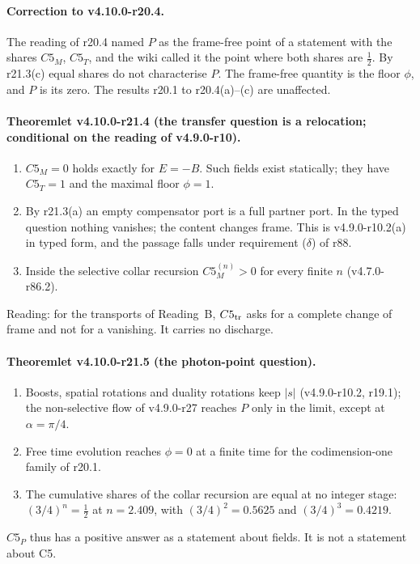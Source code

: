 \paragraph{Correction to v4.10.0-r20.4.}
The reading of r20.4 named \(P\) as the frame-free point of a statement with the shares \(C5_M\), \(C5_T\), and the wiki called it the point
where both shares are \(\tfrac12\).  By r21.3(c) equal shares do not characterise \(P\).  The frame-free quantity is the floor \(\phi\), and
\(P\) is its zero.  The results r20.1 to r20.4(a)--(c) are unaffected.

\paragraph{Theoremlet v4.10.0-r21.4 (the transfer question is a relocation; conditional on the reading of v4.9.0-r10).}
\begin{enumerate}[leftmargin=2em]
\item[(a)] \(C5_M=0\) holds exactly for \(E=-B\).  Such fields exist statically; they have \(C5_T=1\) and the maximal floor \(\phi=1\).
\item[(b)] By r21.3(a) an empty compensator port is a full partner port.  In the typed question nothing vanishes; the content changes
frame.  This is v4.9.0-r10.2(a) in typed form, and the passage falls under requirement (\(\delta\)) of r88.
\item[(c)] Inside the selective collar recursion \(C5_M^{(n)}>0\) for every finite \(n\) (v4.7.0-r86.2).
\end{enumerate}
Reading: for the transports of Reading~B, \(C5_{\rm tr}\) asks for a complete change of frame and not for a vanishing.  It carries no
discharge.

\paragraph{Theoremlet v4.10.0-r21.5 (the photon-point question).}
\begin{enumerate}[leftmargin=2em]
\item[(a)] Boosts, spatial rotations and duality rotations keep \(|s|\) (v4.9.0-r10.2, r19.1); the non-selective flow of v4.9.0-r27 reaches
\(P\) only in the limit, except at \(\alpha=\pi/4\).
\item[(b)] Free time evolution reaches \(\phi=0\) at a finite time for the codimension-one family of r20.1.
\item[(c)] The cumulative shares of the collar recursion are equal at no integer stage: \((3/4)^n=\tfrac12\) at \(n=2.409\), with
\((3/4)^2=0.5625\) and \((3/4)^3=0.4219\).
\end{enumerate}
\(C5_P\) thus has a positive answer as a statement about fields.  It is not a statement about C5.

